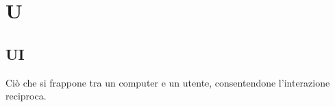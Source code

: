 \section*{U}
\markright{}
\subsection*{UI}
Ciò che si frappone tra un computer e un utente, consentendone l'interazione reciproca.